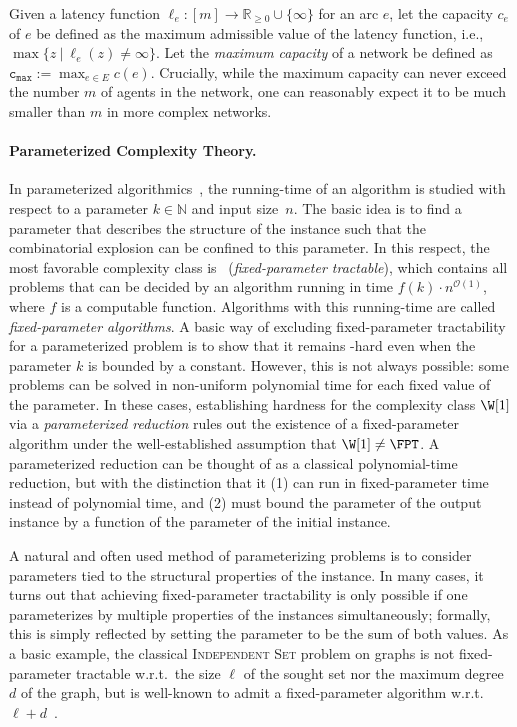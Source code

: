 \documentclass[letterpaper]{article} %
\newcommand{\bigoh}{\ensuremath{{\mathcal O}}}
\newcommand{\cmax}{\mathtt{c_{max}}}
\begin{document}
Given a latency function $\ell_e: [m] \rightarrow \mathbb{R}_{\geq 0}\cup\{\infty\}$ for an arc $e$, let the capacity $c_e$ of $e$ be defined as the maximum admissible value of the latency function, i.e.,~$\max\{z~|~\ell_e(z)\neq \infty\}$. Let the \emph{maximum capacity} of a network be defined as $\cmax:=\max_{e\in E}c(e)$. Crucially, while the maximum capacity can never exceed the number $m$ of agents in the network, one can reasonably expect it to be much smaller than $m$ in more complex networks.

\paragraph{Parameterized Complexity Theory.}
In parameterized algorithmics~\cite{CyganFKLMPPS15,DowneyF13,Niedermeier06}, the
running-time of an algorithm is studied with respect to a parameter
$k\in\mathbb{N}$ and input size~$n$. The basic idea is to find a parameter
that describes the structure of the instance such that the
combinatorial explosion can be confined to this parameter. In this
respect, the most favorable complexity class is \FPT\
(\textit{fixed-parameter tractable}), which contains all problems that
can be decided by an algorithm running in time $f(k)\cdot
n^{\bigoh(1)}$, where $f$ is a computable function. Algorithms with
this running-time are called \emph{fixed-parameter algorithms}.
A basic way of excluding fixed-parameter tractability for a parameterized problem is to show that it remains \NP-hard even when the parameter $k$ is bounded by a constant. However, this is not always possible: some problems can be solved in non-uniform polynomial time for each fixed value of the parameter. In these cases, establishing hardness for the complexity class $\W[1]$ via a \emph{parameterized reduction} rules out the existence of a fixed-parameter algorithm under the well-established assumption that $\W[1]\neq \FPT$. A parameterized reduction can be thought of as a classical polynomial-time reduction, but with the distinction that it (1) can run in fixed-parameter time instead of polynomial time, and (2) must bound the parameter of the output instance by a function of the parameter of the initial instance.

A natural and often used method of parameterizing problems is to consider parameters tied to the structural properties of the instance. In many cases, it turns out that achieving fixed-parameter tractability is only possible if one parameterizes by multiple properties of the instances simultaneously; formally, this is simply reflected by setting the parameter to be the sum of both values. As a basic example, the classical \textsc{Independent Set} problem on graphs is not fixed-parameter tractable w.r.t.\ the size $\ell$ of the sought set nor the maximum degree $d$ of the graph, but is well-known to admit a fixed-parameter algorithm w.r.t.\ $\ell+d$~\cite{CyganFKLMPPS15}.
\end{document}
